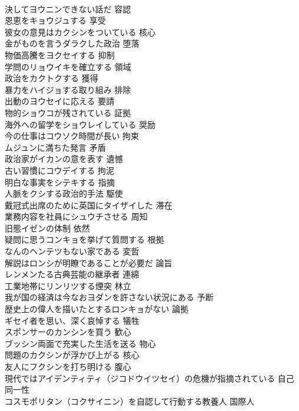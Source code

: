 \documentclass[8pt]{extreport}
\begin{document}
\begin{CJK}{UTF8}{min}
\\	決してヨウニンできない話だ	容認
\\	恩恵をキョウジュする	享受
\\	彼女の意見はカクシンをついている	核心
\\	金がものを言うダラクした政治	堕落
\\	物価高騰をヨクセイする	抑制
\\	学問のリョウイキを確立する	領域
\\	政治をカクトクする	獲得
\\	暴力をハイジョする取り組み	排除
\\	出動のヨウセイに応える	要請
\\	物的ショウコが残されている	証拠
\\	海外への留学をショウレイしている	奨励
\\	今の仕事はコウソク時間が長い	拘束
\\	ムジュンに満ちた発言	矛盾
\\	政治家がイカンの意を表す	遺憾
\\	古い習慣にコウデイする	拘泥
\\	明白な事実をシテキする	指摘
\\	人脈をクシする政治的手法	駆使
\\	戴冠式出席のために英国にタイザイした	滞在
\\	業務内容を社員にシュウチさせる	周知
\\	旧態イゼンの体制	依然
\\	疑問に思うコンキョを挙げて質問する	根拠
\\	なんのヘンテツもない家である	変哲
\\	解説はロンシが明瞭であることが必要だ	論旨
\\	レンメンたる古典芸能の継承者	連綿
\\	工業地帯にリンリツする煙突	林立
\\	我が国の経済は今なおヨダンを許さない状況にある	予断
\\	歴史上の偉人を描いたとするロンキョがない	論拠
\\	ギセイ者を思い、深く哀悼する	犠牲
\\	スポンサーのカンシンを買う	歓心
\\	ブッシン両面で充実した生活を送る	物心
\\	問題のカクシンが浮かび上がる	核心
\\	友人にフクシンを打ち明ける	腹心
\\	現代ではアイデンティティ（ジコドウイツセイ）の危機が指摘されている	自己同一性
\\	コスモポリタン（コクサイニン）を自認して行動する教養人	国際人

\end{CJK}
\end{document}
